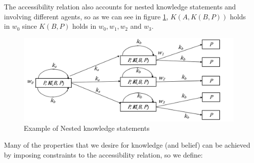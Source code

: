 The accessibility relation also accounts for nested knowledge statements and 
involving different agents, so as we can see in figure \ref{img:nestedKnowledge},
$K(A, K(B, P))$ holds in $w_0$ since $K(B, P)$ holds in $w_0, w_1, w_2$ and $w_3$.

\begin{figure}
    \includegraphics[width=\textwidth]{Images/nestedKnowledge}
    \caption{Example of Nested knowledge statements}
    \label{img:nestedKnowledge}
\end{figure}
Many of the properties that we desire for knowledge (and belief) can be achieved by
imposing constraints to the accessibility relation, so we define:
